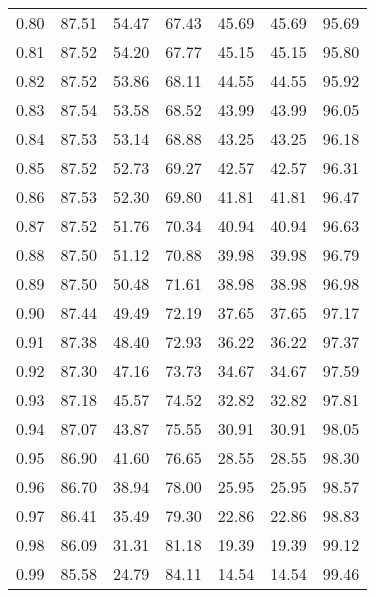 \begin{tabular}{|c|c|c|c|c|c|c|}
      0.80 &     87.51 &     54.47 &      67.43 &   45.69 &      45.69 &         95.69 \\
      0.81 &     87.52 &     54.20 &      67.77 &   45.15 &      45.15 &         95.80 \\
      0.82 &     87.52 &     53.86 &      68.11 &   44.55 &      44.55 &         95.92 \\
      0.83 &     87.54 &     53.58 &      68.52 &   43.99 &      43.99 &         96.05 \\
      0.84 &     87.53 &     53.14 &      68.88 &   43.25 &      43.25 &         96.18 \\
      0.85 &     87.52 &     52.73 &      69.27 &   42.57 &      42.57 &         96.31 \\
      0.86 &     87.53 &     52.30 &      69.80 &   41.81 &      41.81 &         96.47 \\
      0.87 &     87.52 &     51.76 &      70.34 &   40.94 &      40.94 &         96.63 \\
      0.88 &     87.50 &     51.12 &      70.88 &   39.98 &      39.98 &         96.79 \\
      0.89 &     87.50 &     50.48 &      71.61 &   38.98 &      38.98 &         96.98 \\
      0.90 &     87.44 &     49.49 &      72.19 &   37.65 &      37.65 &         97.17 \\
      0.91 &     87.38 &     48.40 &      72.93 &   36.22 &      36.22 &         97.37 \\
      0.92 &     87.30 &     47.16 &      73.73 &   34.67 &      34.67 &         97.59 \\
      0.93 &     87.18 &     45.57 &      74.52 &   32.82 &      32.82 &         97.81 \\
      0.94 &     87.07 &     43.87 &      75.55 &   30.91 &      30.91 &         98.05 \\
      0.95 &     86.90 &     41.60 &      76.65 &   28.55 &      28.55 &         98.30 \\
      0.96 &     86.70 &     38.94 &      78.00 &   25.95 &      25.95 &         98.57 \\
      0.97 &     86.41 &     35.49 &      79.30 &   22.86 &      22.86 &         98.83 \\
      0.98 &     86.09 &     31.31 &      81.18 &   19.39 &      19.39 &         99.12 \\
      0.99 &     85.58 &     24.79 &      84.11 &   14.54 &      14.54 &         99.46 \\
\bottomrule
\end{tabular}

